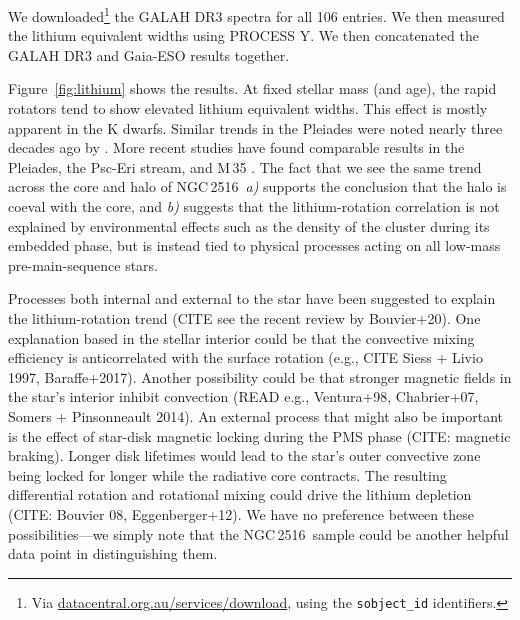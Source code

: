 \documentclass[12pt,twocolumn,tighten]{aastex63}
\newcommand{\cn}{NGC\,2516} %
\begin{document}
We downloaded\footnote{Via \url{datacentral.org.au/services/download},
using the \texttt{sobject\_id} identifiers.}
the GALAH DR3 spectra for all 106 entries.
We then measured the lithium equivalent widths using PROCESS Y.
We then concatenated the GALAH DR3 and Gaia-ESO results together.

Figure~\ref{fig:lithium} shows the results.  At fixed stellar mass
(and age), the rapid rotators tend to show elevated lithium equivalent
widths. This effect is mostly apparent in the K dwarfs.  Similar
trends in the Pleiades were noted nearly three decades ago by
\citet{soderblom_evolution_1993}.  More recent studies have found
comparable results in the Pleiades, the Psc-Eri stream, and M\,35
\citep{bouvier_pleiades_lirot_2018,arancibia_2020,jeffries_m35_li_2020}.
The fact that we see the same trend across the core and halo of \cn\ 
{\it a)} supports the conclusion that the halo is coeval with the
core, and {\it b)} suggests that the lithium-rotation correlation is
not explained by environmental effects such as the density of the cluster
during its embedded phase, but is instead tied to physical processes
acting on all low-mass pre-main-sequence stars.

Processes both internal and external to the star have been suggested to explain
the lithium-rotation trend (CITE see the recent review by Bouvier+20).
One explanation based in the stellar interior could be that the
convective mixing efficiency is anticorrelated with the surface
rotation (e.g., CITE Siess + Livio 1997, Baraffe+2017).  Another
possibility could be that stronger magnetic fields in the star's
interior inhibit convection (READ e.g., Ventura+98, Chabrier+07,
Somers + Pinsonneault 2014).  An external process that might also be
important is the effect of star-disk magnetic locking during the PMS
phase (CITE: magnetic braking).  Longer disk lifetimes would lead to
the star's outer convective zone being locked for longer while the
radiative core contracts.  The resulting differential rotation and
rotational mixing could drive the lithium depletion (CITE: Bouvier 08,
Eggenberger+12).
We have no preference between these possibilities---we simply note
that the \cn\ sample could be another helpful data point in
distinguishing them.
\end{document}
